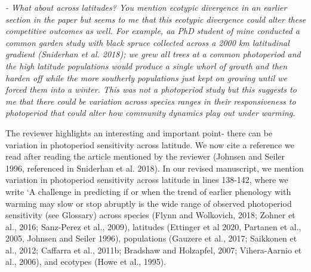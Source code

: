 \documentclass{article}
\begin{document}
 \par \emph{- What about across latitudes? You mention ecotypic divergence in an earlier section in the paper but seems to me that this ecotypic divergence could alter these competitive outcomes as well. For example, aa PhD student of mine conducted a common garden study with black spruce collected across a 2000 km latitudinal gradient (Sniderhan et al. 2018); we grew all trees at a common photoperiod and the high latitude populations would produce a single whorl of growth and then harden off while the more southerly populations just kept on growing until we forced them into a winter. This was not a photoperiod study but this suggests to me that there could be variation across species ranges in their responsiveness to photoperiod that could alter how community dynamics play out under warming.}
\par The reviewer highlights an interesting and important point- there can be variation in photoperiod sensitivity across latitude. We now cite a reference we read after reading the article mentioned by the reviewer (Johnsen and Seiler 1996, referenced in Sniderhan et al. 2018). In our revised manuscript, we mention variation in photoperiod sensitivity across latitude in lines 138-142, where we write `A challenge in predicting if or when the trend of earlier phenology with warming may slow or stop abruptly is the wide range of observed photoperiod sensitivity (see Glossary) across species (Flynn and Wolkovich, 2018; Zohner et al., 2016; Sanz-Perez et al., 2009), latitudes (Ettinger et al 2020, Partanen et al., 2005, Johnsen and Seiler 1996), populations (Gauzere et al., 2017; Saikkonen et al., 2012; Caffarra et al., 2011b; Bradshaw and Holzapfel, 2007; Vihera-Aarnio et al., 2006), and ecotypes (Howe et al., 1995).
\end{document}
